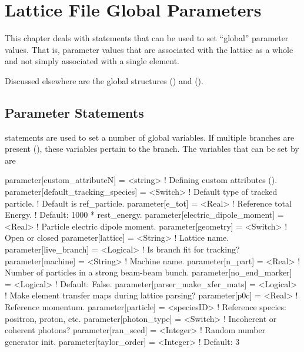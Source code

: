 \chapter{Lattice File Global Parameters}

This chapter deals with statements that can be used to set ``global'' parameter values. That is,
parameter values that are associated with the lattice as a whole and not simply associated with a
single element.

Discussed elsewhere are the global structures ()  
and  ().

\section{Parameter Statements}
\label{s:param}


 statements are used to set a number of global variables.  If multiple branches are
present (), these variables pertain to the  branch. The variables that
can be set by  are
\begin{example}
  parameter[custom_attributeN]        = <string>    ! Defining custom attributes ().
  parameter[default_tracking_species] = <Switch>    ! Default type of tracked particle. 
                                                    !    Default is ref_particle.
  parameter[e_tot]                    = <Real>      ! Reference total Energy. 
                                                    !      Default: 1000 * rest_energy.
  parameter[electric_dipole_moment]   = <Real>      ! Particle electric dipole moment.
  parameter[geometry]                 = <Switch>    ! Open or closed
  parameter[lattice]                  = <String>    ! Lattice name.
  parameter[live_branch]              = <Logical>   ! Is branch fit for tracking?
  parameter[machine]                  = <String>    ! Machine name.
  parameter[n_part]                   = <Real>      ! Number of particles in a strong beam-beam bunch.
  parameter[no_end_marker]            = <Logical>   ! Default: False.
  parameter[parser_make_xfer_mats]    = <Logical>   ! Make element transfer maps during lattice parsing?
  parameter[p0c]                      = <Real>      ! Reference momentum.
  parameter[particle]                 = <speciesID> ! Reference species: positron, proton, etc.
  parameter[photon_type]              = <Switch>    ! Incoherent or coherent photons?
  parameter[ran_seed]                 = <Integer>   ! Random number generator init.
  parameter[taylor_order]             = <Integer>   ! Default: 3
\end{example}

